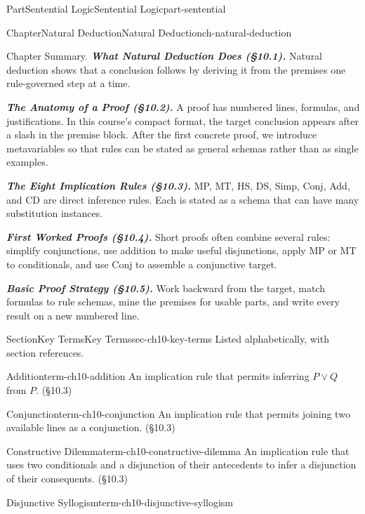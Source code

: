 \documentclass[oneside,10pt,]{book}
\newcommand{\alert}[1]{\textbf{\textit{#1}}}
\begin{document}
\begin{partptx}{Part}{Sentential Logic}{}{Sentential Logic}{}{}{part-sentential}
\begin{chapterptx}{Chapter}{Natural Deduction}{}{Natural Deduction}{}{}{ch-natural-deduction}
\begin{conclusion}{Chapter Summary.}
\alert{What Natural Deduction Does (§10.1).} Natural deduction shows that a conclusion follows by deriving it from the premises one rule-governed step at a time.%
\par
\alert{The Anatomy of a Proof (§10.2).} A proof has numbered lines, formulas, and justifications. In this course's compact format, the target conclusion appears after a slash in the premise block. After the first concrete proof, we introduce metavariables so that rules can be stated as general schemas rather than as single examples.%
\par
\alert{The Eight Implication Rules (§10.3).} MP, MT, HS, DS, Simp, Conj, Add, and CD are direct inference rules. Each is stated as a schema that can have many substitution instances.%
\par
\alert{First Worked Proofs (§10.4).} Short proofs often combine several rules: simplify conjunctions, use addition to make useful disjunctions, apply MP or MT to conditionals, and use Conj to assemble a conjunctive target.%
\par
\alert{Basic Proof Strategy (§10.5).} Work backward from the target, match formulas to rule schemas, mine the premises for usable parts, and write every result on a new numbered line.%
\end{conclusion}%
%
%
\typeout{************************************************}
\typeout{************************************************}
%
\begin{sectionptx}{Section}{Key Terms}{}{Key Terms}{}{}{sec-ch10-key-terms}
Listed alphabetically, with section references.%
%
\begin{descriptionlist}
\begin{dlimedium}{Addition}{term-ch10-addition}%
An implication rule that permits inferring \(P \lor Q\) from \(P\). (§10.3)%
\end{dlimedium}%
\begin{dlimedium}{Conjunction}{term-ch10-conjunction}%
An implication rule that permits joining two available lines as a conjunction. (§10.3)%
\end{dlimedium}%
\begin{dlimedium}{Constructive Dilemma}{term-ch10-constructive-dilemma}%
An implication rule that uses two conditionals and a disjunction of their antecedents to infer a disjunction of their consequents. (§10.3)%
\end{dlimedium}%
\begin{dlimedium}{Disjunctive Syllogism}{term-ch10-disjunctive-syllogism}%

\end{dlimedium}
\end{descriptionlist}
\end{sectionptx}
\end{chapterptx}
\end{partptx}
\end{document}
